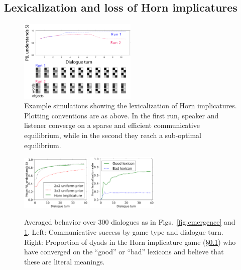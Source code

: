 \documentclass{article} %
\begin{document}
\subsection{Lexicalization and loss of Horn implicatures}
\label{sec:horn-emergence}


\begin{figure}
\centering
\includegraphics[width=0.5\textwidth]{figures/horn-composite.pdf}
\caption{\label{fig:horn} Example simulations showing the
  lexicalization of Horn implicatures. Plotting conventions are as
  above. In the first run, speaker and listener converge on a sparse
  and  efficient communicative equilibrium, while in the second they reach
  a sub-optimal equilibrium.}
\end{figure}



\begin{figure}
\centering
\includegraphics[width=0.3\textwidth]{figures/emergence-average.pdf}
\hspace{0.2in}
\includegraphics[width=0.3\textwidth]{figures/emergence-horn-average.pdf}
\caption{\label{fig:emergence-average} Averaged behavior over 300
  dialogues as in Figs.~\ref{fig:emergence} and \ref{fig:horn}. Left:
  Communicative success by game type and dialogue turn. Right:
  Proportion of dyads in the Horn implicature game
  (\S\ref{sec:horn-emergence}) who have converged on the ``good'' or
  ``bad'' lexicons and believe that these are literal meanings.}
\end{figure}
\end{document}
